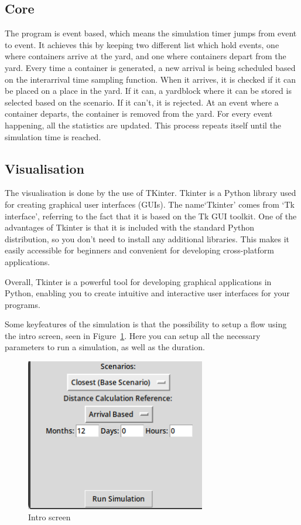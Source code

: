 \documentclass{article}
\begin{document}
\subsection{Core}
The program is event based, which means the simulation timer jumps from event
to event. It achieves this by keeping two different list which hold events, one
where containers arrive at the yard, and one where containers depart from the
yard. Every time a container is generated, a new arrival is being scheduled
based on the interarrival time sampling function. When it arrives, it is
checked if it can be placed on a place in the yard. If it can, a yardblock
where it can be stored is selected based on the scenario. If it can't, it is
rejected. At an event where a container departs, the container is removed from
the yard. For every event happening, all the statistics are updated. This
process repeats itself until the simulation time is reached.

\subsection{Visualisation}
The visualisation is done by the use of TKinter. Tkinter is a Python library
used for creating graphical user interfaces (GUIs). The name`Tkinter' comes
from `Tk interface', referring to the fact that it is based on the Tk GUI
toolkit. One of the advantages of Tkinter is that it is included with the
standard Python distribution, so you don't need to install any additional
libraries. This makes it easily accessible for beginners and convenient for
developing cross-platform applications.

Overall, Tkinter is a powerful tool for developing graphical applications in
Python, enabling you to create intuitive and interactive user interfaces for
your programs.

Some keyfeatures of the simulation is that the possibility to setup a flow
using the intro screen, seen in Figure~\ref{fig:intro}. Here you can setup all
the necessary parameters to run a simulation, as well as the duration.
\begin{figure}
    \centering
    \includegraphics[width=0.7\textwidth]{fig/intro_screen.png}
    \caption{Intro screen}\label{fig:intro}
\end{figure}
\end{document}
